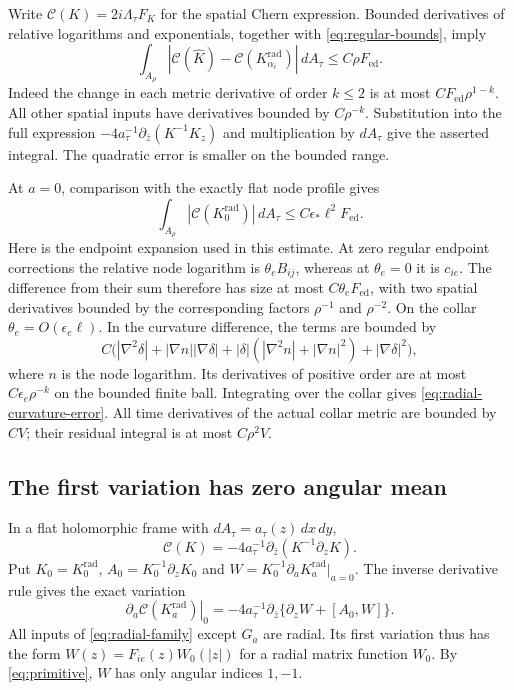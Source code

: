 Write $\mathcal C(K)=2i\Lambda_\tau F_K$ for the spatial Chern
expression. Bounded derivatives of relative logarithms and
exponentials, together with \eqref{eq:regular-bounds}, imply
\begin{equation}\label{eq:regular-curvature-error}
 \int_{A_\rho}
   |\mathcal C(\widehat K)-\mathcal C(K_{\alpha_i}^{\mathrm{rad}})|
                        \,dA_\tau\le C\rho F_{\mathrm{ed}}.
\end{equation}
Indeed the change in each metric derivative of order $k\le2$ is
at most $CF_{\mathrm{ed}}\rho^{1-k}$. All other spatial inputs
have derivatives bounded by $C\rho^{-k}$. Substitution into the
full expression $-4a_\tau^{-1}\partial_{\bar z}(K^{-1}K_z)$
and multiplication by $dA_\tau$ give the asserted integral.
The quadratic error is smaller on the bounded range.

At $a=0$, comparison with the exactly flat node profile gives
\begin{equation}\label{eq:radial-curvature-error}
 \int_{A_\rho}|\mathcal C(K_0^{\mathrm{rad}})|\,dA_\tau
                   \le C\epsilon_*\ell^2F_{\mathrm{ed}}.
\end{equation}
Here is the endpoint expansion used in this estimate. At zero
regular endpoint corrections the relative node logarithm is
$\theta_e B_{ij}$, whereas at $\theta_e=0$ it is $c_{ie}$.
The difference from their sum therefore has size at most
$C\theta_e F_{\mathrm{ed}}$, with two spatial derivatives
bounded by the corresponding factors $\rho^{-1}$ and
$\rho^{-2}$. On the collar $\theta_e=O(\epsilon_e\ell)$.
In the curvature difference, the terms are bounded by
\[
 C\bigl(|\nabla^2\delta|+|\nabla n||\nabla\delta|
       +|\delta|(|\nabla^2n|+|\nabla n|^2)
       +|\nabla\delta|^2\bigr),
\]
where $n$ is the node logarithm. Its derivatives of positive
order are at most $C\epsilon_e\rho^{-k}$ on the bounded finite
ball. Integrating over the collar gives
\eqref{eq:radial-curvature-error}. All time derivatives of the
actual collar metric are bounded by $CV$; their residual integral
is at most $C\rho^2V$.

\subsection{The first variation has zero angular mean}
In a flat holomorphic frame with $dA_\tau=a_\tau(z)\,dx\,dy$,
\[
 \mathcal C(K)=-4a_\tau^{-1}
                         \partial_{\bar z}(K^{-1}\partial_z K).
\]
Put $K_0=K_0^{\mathrm{rad}}$,
$A_0=K_0^{-1}\partial_zK_0$ and
$W=K_0^{-1}\partial_a K_a^{\mathrm{rad}}|_{a=0}$.
The inverse derivative rule gives the exact variation
\begin{equation}\label{eq:chern-first-variation}
 \left.\partial_a\mathcal C(K_a^{\mathrm{rad}})\right|_0
  =-4a_\tau^{-1}\partial_{\bar z}
                       \{\partial_zW+[A_0,W]\}.
\end{equation}
All inputs of \eqref{eq:radial-family} except $G_a$ are radial.
Its first variation thus has the form
$W(z)=F_{ie}(z)W_0(|z|)$ for a radial matrix function $W_0$.
By \eqref{eq:primitive}, $W$ has only angular indices $1,-1$.

